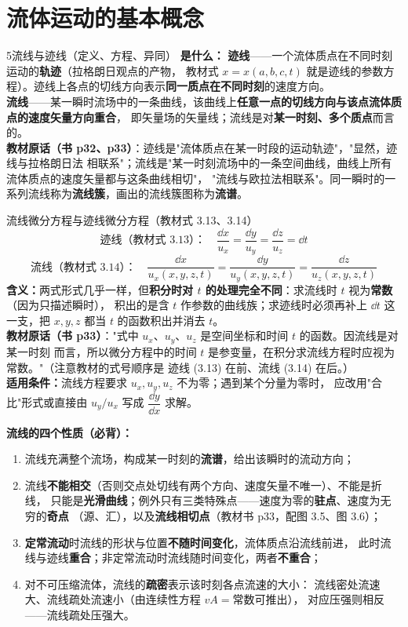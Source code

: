 \section{流体运动的基本概念}

\begin{kaodian}{5}{流线与迹线（定义、方程、异同）}
\textbf{是什么：}
\textbf{迹线}——一个流体质点在不同时刻运动的\textbf{轨迹}（拉格朗日观点的产物，
教材式 $x=x(a,b,c,t)$ 就是迹线的参数方程）。迹线上各点的切线方向表示\textbf{同一质点在不同时刻}的速度方向。\\
\textbf{流线}——某一瞬时流场中的一条曲线，该曲线上\textbf{任意一点的切线方向与该点流体质点的速度矢量方向重合}，
即矢量场的矢量线；流线是对\textbf{某一时刻、多个质点}而言的。\\
\textbf{教材原话（书 p32、p33）}：迹线是"流体质点在某一时段的运动轨迹"，"显然，迹线与拉格朗日法
相联系"；流线是"某一时刻流场中的一条空间曲线，曲线上所有流体质点的速度矢量都与这条曲线相切"，
"流线与欧拉法相联系"。同一瞬时的一系列流线称为\textbf{流线簇}，画出的流线簇图称为\textbf{流谱}。

\begin{gongshi}{流线微分方程与迹线微分方程（教材式 3.13、3.14）}
\[ \text{迹线（教材式 3.13）：}\quad \frac{\dd x}{u_x}=\frac{\dd y}{u_y}=\frac{\dd z}{u_z}=\dd t \]
\[ \text{流线（教材式 3.14）：}\quad \frac{\dd x}{u_x(x,y,z,t)}=\frac{\dd y}{u_y(x,y,z,t)}=\frac{\dd z}{u_z(x,y,z,t)} \]
\textbf{含义：}两式形式几乎一样，但\textbf{积分时对 $t$ 的处理完全不同}：求流线时 $t$ 视为\textbf{常数}（因为只描述瞬时），
积出的是含 $t$ 作参数的曲线族；求迹线时必须再补上 $\dd t$ 这一支，把 $x,y,z$ 都当 $t$ 的函数积出并消去 $t$。\\
\textbf{教材原话（书 p33）}："式中 $u_x$、$u_y$、$u_z$ 是空间坐标和时间 $t$ 的函数。因流线是对某一时刻
而言，所以微分方程中的时间 $t$ 是参变量，在积分求流线方程时应视为常数。"（注意教材的式号顺序是
迹线 (3.13) 在前、流线 (3.14) 在后。）\\
\textbf{适用条件：}流线方程要求 $u_x,u_y,u_z$ 不为零；遇到某个分量为零时，
应改用"合比"形式或直接由 $u_y/u_x$ 写成 $\dfrac{\dd y}{\dd x}$ 求解。
\end{gongshi}

\textbf{流线的四个性质（必背）：}
\begin{enumerate}[label=(\arabic*),leftmargin=2.1em,itemsep=2pt,topsep=3pt]
\item 流线充满整个流场，构成某一时刻的\textbf{流谱}，给出该瞬时的流动方向；
\item 流线\textbf{不能相交}（否则交点处切线有两个方向、速度矢量不唯一）、不能是折线，
只能是\textbf{光滑曲线}；例外只有三类特殊点——速度为零的\textbf{驻点}、速度为无穷的\textbf{奇点}
（源、汇），以及\textbf{流线相切点}（教材书 p33，配图 3.5、图 3.6）；
\item \textbf{定常流动}时流线的形状与位置\textbf{不随时间变化}，流体质点沿流线前进，
此时流线与迹线\textbf{重合}；非定常流动时流线随时间变化，两者\textbf{不重合}；
\item 对不可压缩流体，流线的\textbf{疏密}表示该时刻各点流速的大小：
流线密处流速大、流线疏处流速小（由连续性方程 $vA=$常数可推出），
对应压强则相反——流线疏处压强大。
\end{enumerate}


\end{kaodian}
